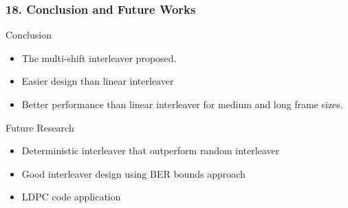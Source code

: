 \documentclass{beamer}  %
\begin{document}
\begin{frame}
\frametitle{18. Conclusion and Future Works}
\begin{block}{Conclusion}
\begin{itemize}
\setlength\itemsep{1em}
\item The multi-shift interleaver proposed.
\item Easier design than linear interleaver
\item Better performance than  linear interleaver for medium and long frame sizes. 
\end{itemize}
\end{block}

\begin{block}{Future Research }



\begin{itemize}
\setlength\itemsep{1em}
\item Deterministic interleaver that outperform random interleaver

\item Good interleaver design using BER bounds approach

\item LDPC code application







\end{itemize}
\end{block}
\end{frame}
\end{document}
